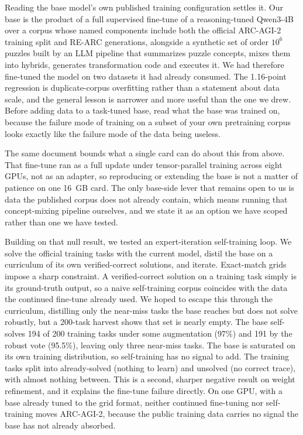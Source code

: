 \documentclass[11pt]{article}
\begin{document}
Reading the base model's own published training configuration settles it. Our base is the product of a
full supervised fine-tune of a reasoning-tuned Qwen3-4B over a corpus whose named components include
both the official ARC-AGI-2 training split and RE-ARC generations, alongside a synthetic set of order
$10^6$ puzzles built by an LLM pipeline that summarizes puzzle concepts, mixes them into hybrids,
generates transformation code and executes it. We had therefore fine-tuned the model on two datasets it
had already consumed. The 1.16-point regression is duplicate-corpus overfitting rather than a statement
about data scale, and the general lesson is narrower and more useful than the one we drew. Before
adding data to a task-tuned base, read what the base was trained on, because the failure mode of
training on a subset of your own pretraining corpus looks exactly like the failure mode of the data
being useless.

The same document bounds what a single card can do about this from above. That fine-tune ran as a full
update under tensor-parallel training across eight GPUs, not as an adapter, so reproducing or extending
the base is not a matter of patience on one 16~GB card. The only base-side lever that remains open to us
is data the published corpus does not already contain, which means running that concept-mixing pipeline
ourselves, and we state it as an option we have scoped rather than one we have tested.

Building on that null result, we tested an expert-iteration self-training loop. We solve the official
training tasks with the current model, distil the base on a curriculum of its own verified-correct
solutions, and iterate. Exact-match grids impose a sharp constraint. A verified-correct solution on a
training task simply is its ground-truth output, so a naive self-training corpus coincides with the
data the continued fine-tune already used. We hoped to escape this through the curriculum, distilling
only the near-miss tasks the base reaches but does not solve robustly, but a 200-task harvest shows
that set is nearly empty. The base self-solves 194 of 200 training tasks under some augmentation
(97\%) and 191 by the robust vote (95.5\%), leaving only three near-miss tasks. The base is saturated
on its own training distribution, so self-training has no signal to add. The training tasks split into
already-solved (nothing to learn) and unsolved (no correct trace), with almost nothing between. This
is a second, sharper negative result on weight refinement, and it explains the fine-tune failure
directly. On one GPU, with a base already tuned to the grid format, neither continued fine-tuning nor
self-training moves ARC-AGI-2, because the public training data carries no signal the base has not
already absorbed.
\end{document}
